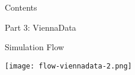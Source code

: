 

\begin{frame}{Contents}
  \begin{center}
   \Large Part 3: ViennaData
  \end{center}
\end{frame}

\begin{frame}{Simulation Flow}
  \begin{center}
   \texttt{[image: flow-viennadata-2.png]}
  \end{center}
\end{frame}











